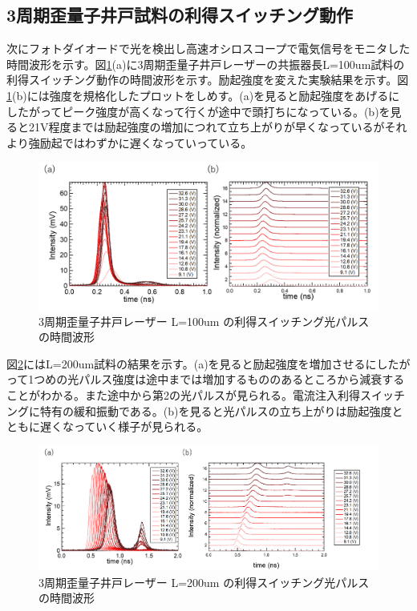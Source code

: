 {\subsection{3周期歪量子井戸試料の利得スイッチング動作}%
次にフォトダイオードで光を検出し高速オシロスコープで電気信号をモニタした時間波形を示す。図\ref{fig:fig_3_2_3QW_ridge_L100_GS}(a)に3周期歪量子井戸レーザーの共振器長L=100um試料の利得スイッチング動作の時間波形を示す。励起強度を変えた実験結果を示す。図\ref{fig:fig_3_2_3QW_ridge_L100_GS}(b)には強度を規格化したプロットをしめす。(a)を見ると励起強度をあげるにしたがってピーク強度が高くなって行くが途中で頭打ちになっている。(b)を見ると21V程度までは励起強度の増加につれて立ち上がりが早くなっているがそれより強励起ではわずかに遅くなっていっている。
\begin{figure}[h]
	\centering
	\includegraphics[width=15cm]{figure/fig_3_2_3QW_ridge_L100_GS.png}
		\caption{3周期歪量子井戸レーザー L=100um の利得スイッチング光パルスの時間波形}
		\label{fig:fig_3_2_3QW_ridge_L100_GS}
\end{figure}


図\ref{fig:fig_3_2_3QW_ridge_L200_GS}にはL=200um試料の結果を示す。(a)を見ると励起強度を増加させるにしたがって1つめの光パルス強度は途中までは増加するもののあるところから減衰することがわかる。また途中から第2の光パルスが見られる。電流注入利得スイッチングに特有の緩和振動である。(b)を見ると光パルスの立ち上がりは励起強度とともに遅くなっていく様子が見られる。


\begin{figure}[h]
	\centering
	\includegraphics[width=15cm]{figure/fig_3_2_3QW_ridge_L200_GS.png}
		\caption{3周期歪量子井戸レーザー L=200um の利得スイッチング光パルスの時間波形}
		\label{fig:fig_3_2_3QW_ridge_L200_GS}
\end{figure}



}
